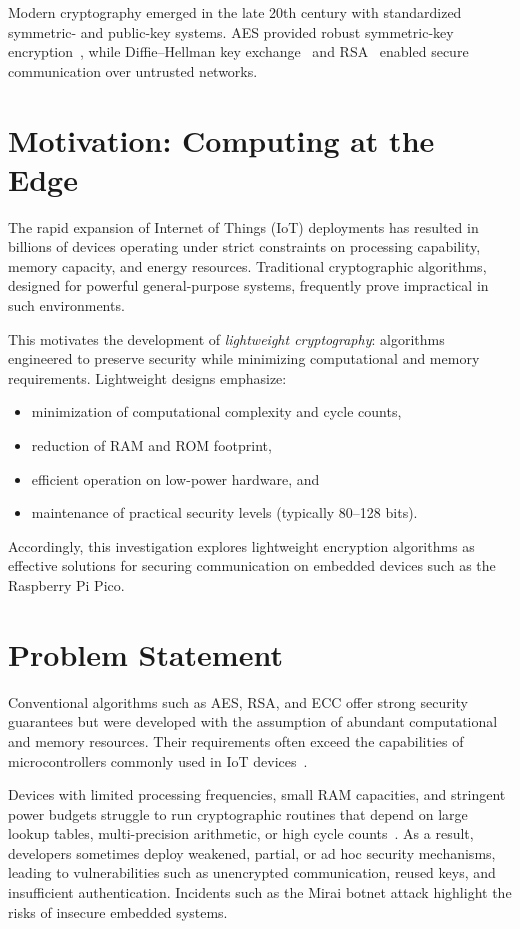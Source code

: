 \documentclass[12pt]{report}
\begin{document}
Modern cryptography emerged in the late 20th century with standardized symmetric- and public-key
systems. AES provided robust symmetric-key encryption~\cite{nist2001aes}, while Diffie–Hellman
key exchange~\cite{diffie1976new} and RSA~\cite{rivest1978method} enabled secure communication
over untrusted networks.

\section{Motivation: Computing at the Edge}

The rapid expansion of Internet of Things (IoT) deployments has resulted in billions of
devices operating under strict constraints on processing capability, memory capacity,
and energy resources. Traditional cryptographic algorithms, designed for powerful general-purpose
systems, frequently prove impractical in such environments.

This motivates the development of \textit{lightweight cryptography}: algorithms engineered
to preserve security while minimizing computational and memory requirements. Lightweight
designs emphasize:
\begin{itemize}
    \item minimization of computational complexity and cycle counts,
    \item reduction of RAM and ROM footprint,
    \item efficient operation on low-power hardware, and
    \item maintenance of practical security levels (typically 80--128 bits).
\end{itemize}

Accordingly, this investigation explores lightweight encryption algorithms as effective
solutions for securing communication on embedded devices such as the Raspberry Pi Pico.

\section{Problem Statement}

Conventional algorithms such as AES, RSA, and ECC offer strong security guarantees but
were developed with the assumption of abundant computational and memory resources. Their
requirements often exceed the capabilities of microcontrollers commonly used in IoT
devices~\cite{al2015iot}.

Devices with limited processing frequencies, small RAM capacities, and stringent power
budgets struggle to run cryptographic routines that depend on large lookup tables,
multi-precision arithmetic, or high cycle counts~\cite{al2015iot}. As a result, developers
sometimes deploy weakened, partial, or ad hoc security mechanisms, leading to vulnerabilities
such as unencrypted communication, reused keys, and insufficient authentication. Incidents
such as the Mirai botnet attack highlight the risks of insecure embedded systems.
\end{document}
